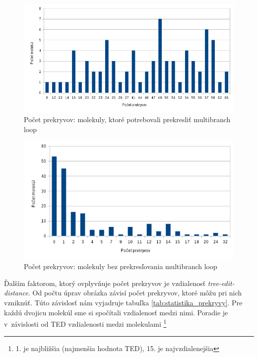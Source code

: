 \begin{figure}
  \includegraphics[width=1\textwidth]{../img/statistika/prekryvy-pocetmolekul-s-rotaciami}
  \caption{Počet prekryvov: molekuly, ktoré potrebovali prekresliť multibranch loop}
  \label{obr:statistika_prekryvy_bez_rotacii}
\end{figure}

\begin{figure}
  \includegraphics[width=1\textwidth]{../img/statistika/prekryvy-pocetmolekul-bez-rotacii}
  \caption{Počet prekryvov: molekuly bez prekresľovania multibranch loop}
  \label{obr:statistika_prekryvy_s_rotaciami}
\end{figure}

Ďalším faktorom, ktorý ovplyvňuje počet prekryvov je vzdialenosť \textit{tree-edit-distance}.
Od počtu úprav obrázka závisí počet prekryvov, ktoré môžu pri nich vzniknúť.
Túto závislosť nám vyjadruje tabuľka \ref{tab:statistika_prekryvy}.
Pre každú dvojicu molekúl sme si spočítali vzdialenosť medzi nimi.
Poradie je v~závislosti od TED vzdialenosti medzi molekulami%
\footnote{1. je najbližšia (najmenšia hodnota TED), 15. je najvzdialenejšia}

